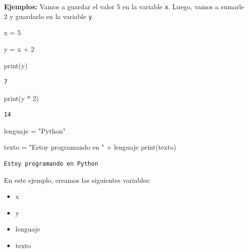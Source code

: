 \documentclass[
  letterpaper,
  DIV=11,
  numbers=noendperiod]{scrreprt}
\newenvironment{Shaded}{\begin{snugshade}}{\end{snugshade}}
\newcommand{\BuiltInTok}[1]{\textcolor[rgb]{0.00,0.23,0.31}{#1}}
\newcommand{\DecValTok}[1]{\textcolor[rgb]{0.68,0.00,0.00}{#1}}
\newcommand{\NormalTok}[1]{\textcolor[rgb]{0.00,0.23,0.31}{#1}}
\newcommand{\OperatorTok}[1]{\textcolor[rgb]{0.37,0.37,0.37}{#1}}
\newcommand{\StringTok}[1]{\textcolor[rgb]{0.13,0.47,0.30}{#1}}
\providecommand{\tightlist}{%
  \setlength{\itemsep}{0pt}\setlength{\parskip}{0pt}}\usepackage{longtable,booktabs,array}
\begin{document}
\textbf{Ejemplos:} Vamos a guardar el valor 5 en la variable \texttt{x}.
Luego, vamos a sumarle 2 y guardarlo en la variable \texttt{y}.

\begin{Shaded}
\begin{Highlighting}[]
\NormalTok{x }\OperatorTok{=} \DecValTok{5}
\end{Highlighting}
\end{Shaded}

\begin{Shaded}
\begin{Highlighting}[]
\NormalTok{y }\OperatorTok{=}\NormalTok{ x }\OperatorTok{+} \DecValTok{2}
\end{Highlighting}
\end{Shaded}

\begin{Shaded}
\begin{Highlighting}[]
\BuiltInTok{print}\NormalTok{(y)}
\end{Highlighting}
\end{Shaded}

\begin{verbatim}
7
\end{verbatim}

\begin{Shaded}
\begin{Highlighting}[]
\BuiltInTok{print}\NormalTok{(y }\OperatorTok{*} \DecValTok{2}\NormalTok{)}
\end{Highlighting}
\end{Shaded}

\begin{verbatim}
14
\end{verbatim}

\begin{Shaded}
\begin{Highlighting}[]
\NormalTok{lenguaje }\OperatorTok{=} \StringTok{"Python"}

\NormalTok{texto }\OperatorTok{=} \StringTok{"Estoy programando en "} \OperatorTok{+}\NormalTok{ lenguaje}
\BuiltInTok{print}\NormalTok{(texto)}
\end{Highlighting}
\end{Shaded}

\begin{verbatim}
Estoy programando en Python
\end{verbatim}

En este ejemplo, creamos las siguientes variables:

\begin{itemize}
\tightlist
\item
  x
\item
  y
\item
  lenguaje
\item
  texto
\end{itemize}
\end{document}
